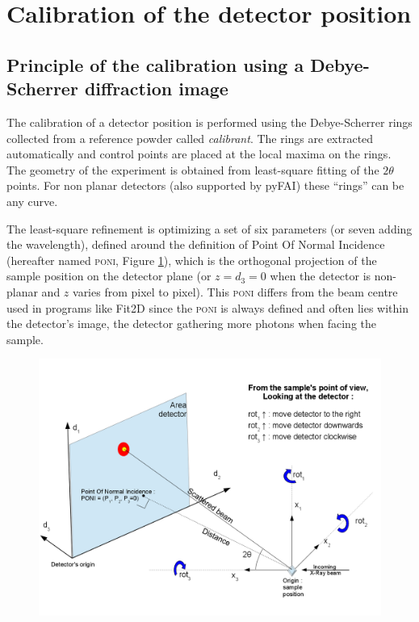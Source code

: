\documentclass[preprint, pdf]{iucr}              %
\let\caption\foo
\begin{document}
\section{Calibration of the detector position}

\subsection{Principle of the calibration using a Debye-Scherrer diffraction
image}
The calibration of a detector position is performed using the Debye-Scherrer
rings collected from a reference powder called \textit{calibrant}.
The rings are extracted automatically and control points are placed at the
local maxima on the rings.
The geometry of the experiment is obtained from least-square fitting of
the $2\theta$ points.
For non planar detectors (also supported by pyFAI) these ``rings'' can
be any curve.

The least-square refinement is optimizing a set of six parameters
(or seven adding the wavelength), defined around the  definition of Point
Of Normal Incidence (hereafter named \textsc{poni}, Figure \ref{poni}), which is
the orthogonal projection  of the sample position on the detector plane (or
$z=d_3=0$ when the detector is non-planar and $z$ varies from pixel to pixel).
This \textsc{poni} differs from the beam centre used in programs like
Fit2D \cite{Hammersley:fs5107} since the \textsc{poni} is always defined and often lies
within the detector's image, the detector gathering more photons 
when facing the sample.

\begin{figure}
\label{poni}
\begin{center}
\includegraphics[width=15cm]{images/PONI.png}
\caption{Geometry used in pyFAI.}
\end{center}
\end{figure}
\end{document}
